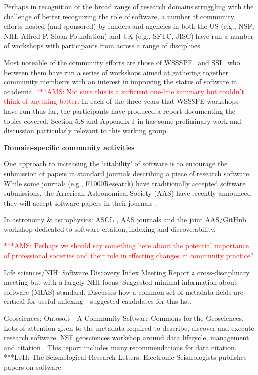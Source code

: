 \documentclass[11pt, oneside]{amsart}
\newcommand{\asnote}[1]{ {\textcolor{red} { ***AMS: #1 }}} %
\newcommand{\LJHnote}[1]{ {\textcolor{fuschsia} { ***LJH: #1 }}} %
\begin{document}
Perhaps in recognition of the broad range of research domains struggling with
the challenge of better recognizing the role of software, a number of community
efforts hosted (and sponsored) by funders and agencies in both the US (e.g., NSF,
NIH, Alfred P. Sloan Foundation) and UK (e.g., SFTC, JISC) have run a number of
workshops with participants from across a range of disciplines.

Most noteable of the community efforts are those of WSSSPE~\cite{wssspe} and SSI~\cite{ssi-workshops} who between them have run a series of workshops aimed at gathering together community memberrs with an interest in improving the status of software in academia. \asnote{Not sure this is a sufficient one-line summary but couldn't think of anything better.} In each of the three years that WSSSPE workshops have run thus far, the participants have produced a report documenting the topics covered. Section 5.8 and Appendix J in \cite{WSSSPE3} has some preliminary work and discussion particularly relevant to this working group.

\textbf{Domain-specific community activities}

One approach to increasing the `citability' of software is to encourage the
submission of papers in standard journals describing a piece of research
software. While some journals (e.g., F1000Research) have traditionally accepted
software submissions, the American Astronomical Society (AAS) have recently
announced they will accept software papers in their journals
\cite{aas-sofware-papers}.

In astronomy \& astrophysics: ASCL \cite{ascl}, AAS journals  and the joint
AAS/GitHub workshop \cite{aas-software-index} dedicated to software citation,
indexing and discoverability.

\asnote{Perhaps we should say something here about the potential importance of professional societies and their role in effecting changes in community practice?}

Life sciences/NIH: Software Discovery Index Meeting Report \cite{software-discovery-index} a cross-disciplinary meeting
but with a largely NIH-focus. Suggested minimal information about software (MIAS) standard. Discusses how a common set of metadata
fields are critical for useful indexing - suggested candidates for this list.

Geosciences: Ontosoft \cite{ontosoft} - A Community Software Commons for the Geosciences. Lots of attention given to the metadata
required to describe, discover and execute research software. NSF geosciences workshop around data lifecycle, management and citation \cite{nsf-geo-data}. This report includes many recommendations for data citation.
\LJHnote{ The Seismological Research Letters, Electronic Seismologists publishes papers on software.} %
\end{document}
